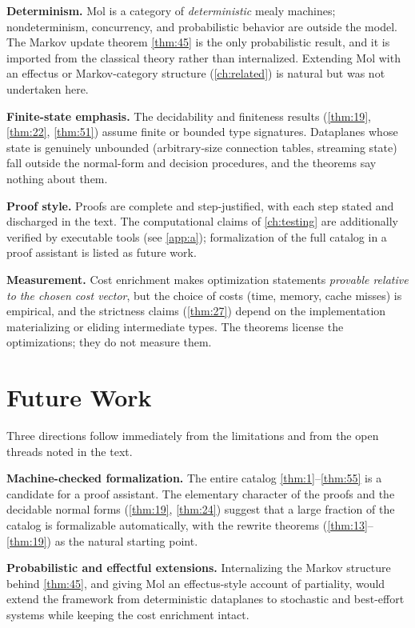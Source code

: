 \textbf{Determinism.} Mol is a category of \emph{deterministic} mealy machines; nondeterminism, concurrency, and probabilistic behavior are outside the model. The Markov update theorem \ref{thm:45} is the only probabilistic result, and it is imported from the classical theory rather than internalized. Extending Mol with an effectus or Markov-category structure (\autoref{ch:related}) is natural but was not undertaken here.

\textbf{Finite-state emphasis.} The decidability and finiteness results (\ref{thm:19}, \ref{thm:22}, \ref{thm:51}) assume finite or bounded type signatures. Dataplanes whose state is genuinely unbounded (arbitrary-size connection tables, streaming state) fall outside the normal-form and decision procedures, and the theorems say nothing about them.

\textbf{Proof style.} Proofs are complete and step-justified, with each step stated and discharged in the text. The computational claims of \autoref{ch:testing} are additionally verified by executable tools (see \autoref{app:a}); formalization of the full catalog in a proof assistant is listed as future work.

\textbf{Measurement.} Cost enrichment makes optimization statements \emph{provable relative to the chosen cost vector}, but the choice of costs (time, memory, cache misses) is empirical, and the strictness claims (\ref{thm:27}) depend on the implementation materializing or eliding intermediate types. The theorems license the optimizations; they do not measure them.

\section{Future Work}
Three directions follow immediately from the limitations and from the open threads noted in the text.

\textbf{Machine-checked formalization.} The entire catalog \autoref{thm:1}--\autoref{thm:55} is a candidate for a proof assistant. The elementary character of the proofs and the decidable normal forms (\ref{thm:19}, \ref{thm:24}) suggest that a large fraction of the catalog is formalizable automatically, with the rewrite theorems (\ref{thm:13}--\ref{thm:19}) as the natural starting point.

\textbf{Probabilistic and effectful extensions.} Internalizing the Markov structure behind \ref{thm:45}, and giving Mol an effectus-style account of partiality, would extend the framework from deterministic dataplanes to stochastic and best-effort systems while keeping the cost enrichment intact.

